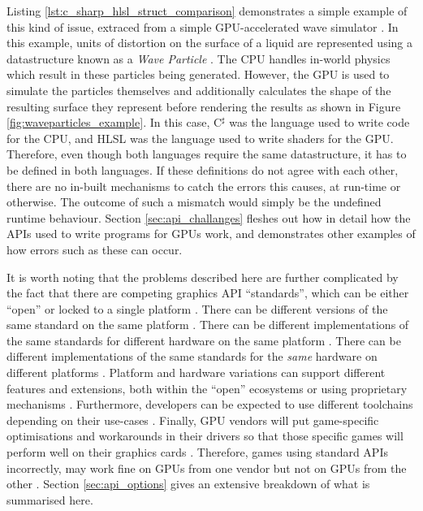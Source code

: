 \documentclass[a4paper,12pt,twoside,openright]{report}
\begin{document}
Listing \ref{lst:c_sharp_hlsl_struct_comparison} demonstrates a simple example
of this kind of issue, extraced from a simple GPU-accelerated wave simulator
\cite{WaveParticlesGPU}. In this example, units of distortion on the surface of
a liquid are represented using a datastructure known as a \textit{Wave
Particle} \cite{WaveParticlesOriginalPaper}. The CPU handles in-world physics
which result in these particles being generated. However, the GPU is used to
simulate the particles themselves and additionally calculates the shape of the
resulting surface they represent before rendering the results as shown in
Figure \ref{fig:waveparticles_example}. In this case, C$^\sharp$ was the
language used to write code for the CPU, and HLSL was the language used to
write shaders for the GPU. Therefore, even though both languages require the
same datastructure, it has to be defined in both languages. If these
definitions do not agree with each other, there are no in-built mechanisms to
catch the errors this causes, at run-time or otherwise. The outcome of such a
mismatch would simply be the undefined runtime behaviour. Section
\ref{sec:api_challanges} fleshes out how in detail how the APIs used to write
programs for GPUs work, and demonstrates other examples of how errors such as
these can occur.

It is worth noting that the problems described here are further complicated by
the fact that there are competing graphics API ``standards'', which can be
either ``open'' \cite{OpenGL} \cite{Vulkan} or locked to a single platform
\cite{Direct3D} \cite{Metal}. There can be different versions of the same
standard on the same platform \cite{OpenGLHistory}. There can be different
implementations of the same standards for different hardware on the same
platform \cite{NVIDIADrivers} \cite{NVIDIADrivers}. There can be different
implementations of the same standards for the \textit{same} hardware on
different platforms \cite{OpenGLGettingStarted}. Platform and hardware
variations can support different features and extensions, both within the
``open'' ecosystems \cite{VulkanExtensions} or using proprietary mechanisms
\cite{PhysXSDK} \cite{HairworksAMD}. Furthermore, developers can be expected to
use different toolchains depending on their use-cases
\cite{KhronosDeveloperOverview}. Finally, GPU vendors will put game-specific
optimisations and workarounds in their drivers so that those specific games
will perform well on their graphics cards \cite{WhyGamesAreWorseOnLinux}.
Therefore, games using standard APIs incorrectly, may work fine on GPUs from
one vendor but not on GPUs from the other \cite{TODO}. Section
\ref{sec:api_options} gives an extensive breakdown of what is summarised here.
\end{document}
